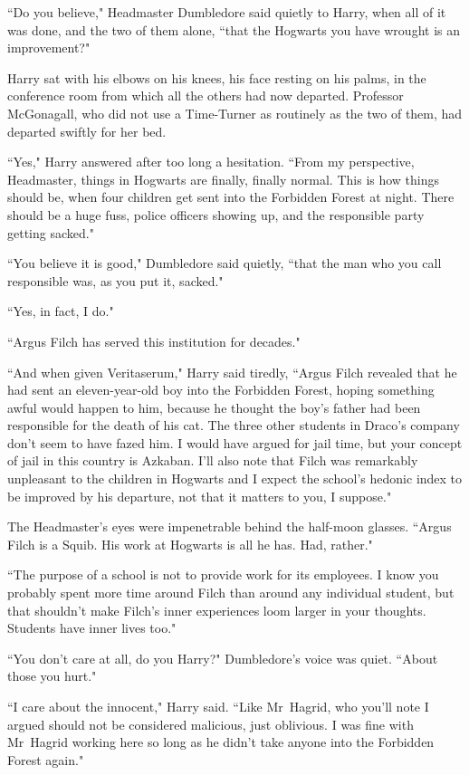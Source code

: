 ``Do you believe," Headmaster Dumbledore said quietly to Harry, when all of it was done, and the two of them alone, ``that the Hogwarts you have wrought is an improvement?"

Harry sat with his elbows on his knees, his face resting on his palms, in the conference room from which all the others had now departed. Professor McGonagall, who did not use a Time-Turner as routinely as the two of them, had departed swiftly for her bed.

``Yes," Harry answered after too long a hesitation. ``From my perspective, Headmaster, things in Hogwarts are finally, finally normal. This is how things should be, when four children get sent into the Forbidden Forest at night. There should be a huge fuss, police officers showing up, and the responsible party getting sacked."

``You believe it is good," Dumbledore said quietly, ``that the man who you call responsible was, as you put it, sacked."

``Yes, in fact, I do."

``Argus Filch has served this institution for decades."

``And when given Veritaserum," Harry said tiredly, ``Argus Filch revealed that he had sent an eleven-year-old boy into the Forbidden Forest, hoping something awful would happen to him, because he thought the boy's father had been responsible for the death of his cat. The three other students in Draco's company don't seem to have fazed him. I would have argued for jail time, but your concept of jail in this country is Azkaban. I'll also note that Filch was remarkably unpleasant to the children in Hogwarts and I expect the school's hedonic index to be improved by his departure, not that it matters to you, I suppose."

The Headmaster's eyes were impenetrable behind the half-moon glasses. ``Argus Filch is a Squib. His work at Hogwarts is all he has. Had, rather."

``The purpose of a school is not to provide work for its employees. I know you probably spent more time around Filch than around any individual student, but that shouldn't make Filch's inner experiences loom larger in your thoughts. Students have inner lives too."

``You don't care at all, do you Harry?" Dumbledore's voice was quiet. ``About those you hurt."

``I care about the innocent," Harry said. ``Like Mr~Hagrid, who you'll note I argued should not be considered malicious, just oblivious. I was fine with Mr~Hagrid working here so long as he didn't take anyone into the Forbidden Forest again."


